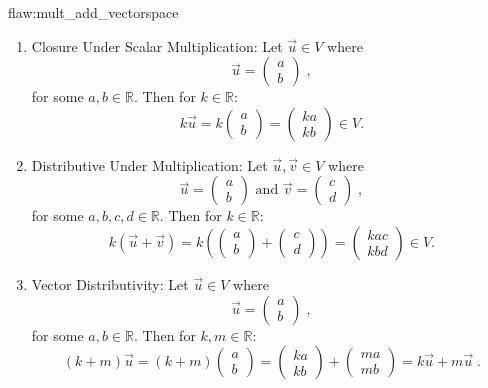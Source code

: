 \begin{flaw}{flaw:mult_add_vectorspace}
\begin{enumerate}
\item Closure Under Scalar Multiplication: Let $\vec{u} \in V$ where $$ \vec{u} = \begin{pmatrix}
a \\
b
\end{pmatrix}\;,$$
for some $a,b \in \mathbb{R}.$ Then for $k \in \mathbb{R}:$
$$k\vec{u} = k \begin{pmatrix}
a \\
b
\end{pmatrix} = \begin{pmatrix}
ka \\
kb
\end{pmatrix} \in V.$$

\item Distributive Under Multiplication: Let $\vec{u}, \vec{v} \in V$ where $$ \vec{u} = \begin{pmatrix}
a \\
b
\end{pmatrix} \text{ and } \vec{v} = \begin{pmatrix}
c \\
d
\end{pmatrix}\;,$$
for some $a,b,c,d \in \mathbb{R}.$ Then for $k \in \mathbb{R}:$
$$k(\vec{u}+\vec{v}) = k \left(\begin{pmatrix}
a \\
b
\end{pmatrix} + \begin{pmatrix}
c \\
d
\end{pmatrix}\right) = \begin{pmatrix}
kac \\
kbd
\end{pmatrix} \in V.$$

\item Vector Distributivity: Let $\vec{u} \in V$ where $$ \vec{u} = \begin{pmatrix}
a \\
b
\end{pmatrix}\;,$$
for some $a,b \in \mathbb{R}.$ Then for $k,m \in \mathbb{R}:$
$$\left(k+m\right)\vec{u} = \left(k+m\right) \begin{pmatrix}
a \\
b
\end{pmatrix} = \begin{pmatrix}
ka \\
kb
\end{pmatrix} + \begin{pmatrix}
ma \\
mb
\end{pmatrix} = k\vec{u} + m\vec{u}\;.$$


\end{enumerate}
\end{flaw}
